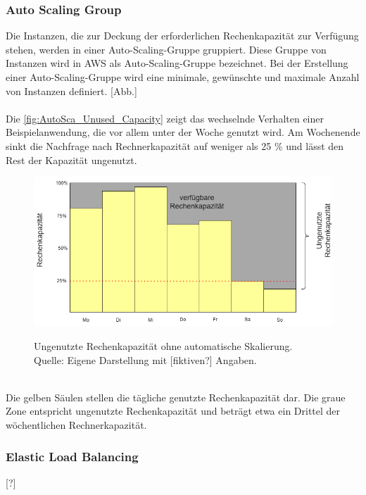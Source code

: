\subsubsection*{Auto Scaling Group}
Die Instanzen, die zur Deckung der erforderlichen Rechenkapazität zur Verfügung stehen, werden in einer Auto-Scaling-Gruppe gruppiert. Diese Gruppe von Instanzen wird in AWS als Auto-Scaling-Gruppe bezeichnet. Bei der Erstellung einer Auto-Scaling-Gruppe wird eine minimale, gewünschte und maximale Anzahl von Instanzen definiert. 
[Abb.]
\\\\
Die \autoref{fig:AutoSca_Unused_Capacity} zeigt das wechselnde Verhalten einer Beispielanwendung, die vor allem unter der Woche genutzt wird. Am Wochenende sinkt die Nachfrage nach Rechnerkapazität auf weniger als 25 \% und lässt den Rest der Kapazität ungenutzt. 
\begin{figure}[h]
    \centering
    \includegraphics[scale=0.5]{sources/AutoCap Unused Capacity}
    \caption[Ungenutzte Rechenkapazität ohne automatische Skalierung]{}
    \label{fig:AutoSca_Unused_Capacity} Ungenutzte Rechenkapazität ohne automatische Skalierung. \\
    Quelle: Eigene Darstellung mit [fiktiven?] Angaben. 
  \end{figure}\\
Die gelben Säulen stellen die tägliche genutzte Rechenkapazität dar.
Die graue Zone entspricht ungenutzte Rechenkapazität und beträgt etwa ein Drittel der wöchentlichen Rechnerkapazität.
\subsubsection*{Elastic Load Balancing}%
[?]
